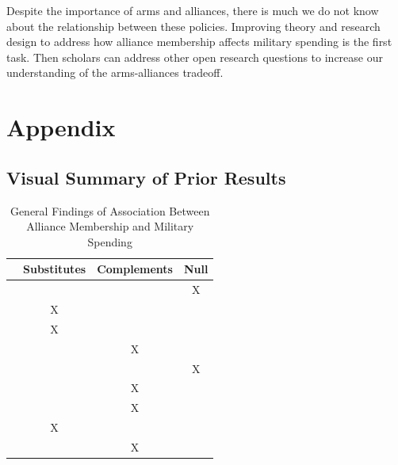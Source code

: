 \documentclass[12pt]{article}
\begin{document}
Despite the importance of arms and alliances, there is much we do not know about the relationship between these policies. Improving theory and research design to address how alliance membership affects military spending is the first task. Then scholars can address other open research questions to increase our understanding of the arms-alliances tradeoff.  




\section*{Appendix}

\subsection*{Visual Summary of Prior Results} 


\begin{table}[hbt!]
\begin{tabular}{lccc}
     & Substitutes & Complements & Null \\
\hline
\citet{MostSiverson1987} &  &  & X \\
\citet{Morrow1993} & X &  &  \\ 
\citet{Conybeare1994} & X & &  \\
\citet{Diehl1994} &  & X &  \\
\citet{Goldsmith2003} &  &  & X \\
\citet{MorganPalmer2006} &  & X & \\ 
\citet{QuirozFlores2011} &  & X &  \\ 
\citet{DigiuseppePoast2016} & X & & \\ 
\citet{Horowitzetal2017} &  & X & \\ 
\hline
\end{tabular}
\caption{General Findings of Association Between Alliance Membership and Military Spending}
\end{table}
\end{document}
